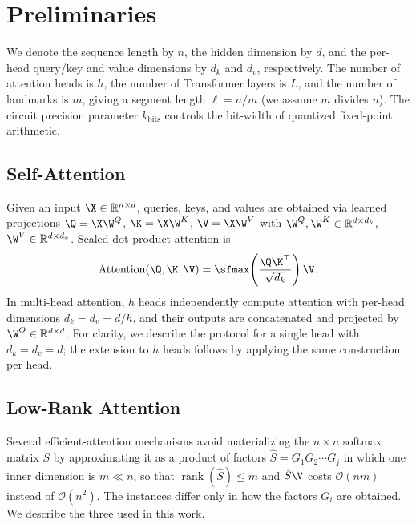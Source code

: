 \section{Preliminaries}
\label{sec:preliminaries}

We denote the sequence length by $n$, the hidden dimension by $d$, and the per-head query/key and value dimensions by $d_k$ and $d_v$, respectively. The number of attention heads is $h$, the number of Transformer layers is $L$, and the number of landmarks is $m$, giving a segment length $\ell = n/m$ (we assume $m$ divides $n$). The circuit precision parameter $k_{\text{bits}}$ controls the bit-width of quantized fixed-point arithmetic.

\subsection{Self-Attention}
Given an input $\X \in \mathbb{R}^{n \times d}$, queries, keys, and values are obtained via learned projections $\Q = \X \W^Q$, $\K = \X \W^K$, $\V = \X \W^V$ with $\W^Q, \W^K \in \mathbb{R}^{d \times d_k}$, $\W^V \in \mathbb{R}^{d \times d_v}$. Scaled dot-product attention is
\[
    \text{Attention} (\Q, \K, \V ) = \sfmax\!\left(\frac{\Q\K^\top}{\sqrt{d_k}}\right)\V.
\]
In multi-head attention, $h$ heads independently compute attention with per-head dimensions $d_k = d_v = d/h$, and their outputs are concatenated and projected by $\W^O \in \mathbb{R}^{d \times d}$. For clarity, we describe the protocol for a single head with $d_k = d_v = d$; the extension to $h$ heads follows by applying the same construction per head.

\subsection{Low-Rank Attention}\label{subsec:lowrank}
Several efficient-attention mechanisms avoid materializing the $n \times n$ softmax matrix $S$ by approximating it as a product of factors $\hat S = G_1 G_2 \cdots G_j$ in which one inner dimension is $m \ll n$, so that $\operatorname{rank}(\hat S) \le m$ and $\hat S \V$ costs $\mathcal{O}(nm)$ instead of $\mathcal{O}(n^2)$. The instances differ only in how the factors $G_i$ are obtained. We describe the three used in this work.

